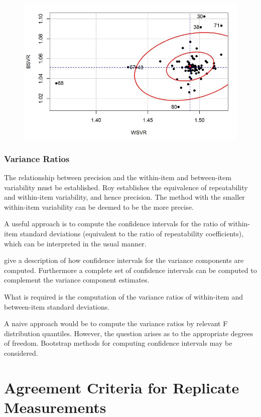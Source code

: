 \documentclass[12pt, a4paper]{report}
\theoremstyle{plain}
\theoremstyle{definition}
\theoremstyle{remark}
\begin{document}
	\begin{figure}[h!]
		\centering
		\includegraphics[width=0.9\linewidth]{08-plot1}
		\caption{}
		\label{fig:08-plot1}
	\end{figure}
	


\subsubsection{Variance Ratios}
	
The relationship between precision and the within-item and between-item variability must be established. Roy establishes the equivalence of repeatability and within-item variability, and hence precision.  The method with the smaller within-item variability can be deemed to be the more precise.
	
A useful approach is to compute the confidence intervals for the ratio of within-item standard deviations (equivalent to the ratio of repeatability coefficients), which can be interpreted in the usual manner.
	
\citet[pg 93-95]{PB} give a description of how confidence intervals for the variance components are computed. Furthermore a complete set of confidence intervals can be computed to complement the variance component estimates.
	
	What is required is the computation of the variance ratios of within-item and between-item standard deviations.
	
	A naive approach would be to compute the variance ratios by relevant F distribution quantiles. However, the question arises as to the appropriate degrees of freedom.
	Bootstrap methods for computing confidence intervals may be considered.
	

\section{Agreement Criteria for Replicate Measurements}	
\end{document}
